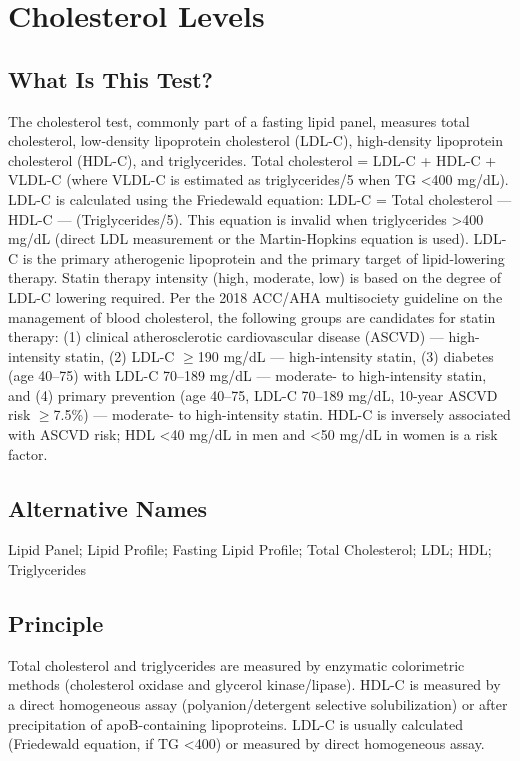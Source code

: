 \chapter{Cholesterol Levels}
\section*{What Is This Test?}
The cholesterol test, commonly part of a fasting lipid panel, measures total cholesterol, low-density lipoprotein cholesterol (LDL-C), high-density lipoprotein cholesterol (HDL-C), and triglycerides. Total cholesterol = LDL-C + HDL-C + VLDL-C (where VLDL-C is estimated as triglycerides/5 when TG <400 mg/dL). LDL-C is calculated using the Friedewald equation: LDL-C = Total cholesterol --- HDL-C --- (Triglycerides/5). This equation is invalid when triglycerides >400 mg/dL (direct LDL measurement or the Martin-Hopkins equation is used). LDL-C is the primary atherogenic lipoprotein and the primary target of lipid-lowering therapy. Statin therapy intensity (high, moderate, low) is based on the degree of LDL-C lowering required. Per the 2018 ACC/AHA multisociety guideline on the management of blood cholesterol, the following groups are candidates for statin therapy: (1) clinical atherosclerotic cardiovascular disease (ASCVD) --- high-intensity statin, (2) LDL-C $\geq$190 mg/dL --- high-intensity statin, (3) diabetes (age 40--75) with LDL-C 70--189 mg/dL --- moderate- to high-intensity statin, and (4) primary prevention (age 40--75, LDL-C 70--189 mg/dL, 10-year ASCVD risk $\geq$7.5\%) --- moderate- to high-intensity statin. HDL-C is inversely associated with ASCVD risk; HDL <40 mg/dL in men and <50 mg/dL in women is a risk factor.
\section*{Alternative Names}
Lipid Panel; Lipid Profile; Fasting Lipid Profile; Total Cholesterol; LDL; HDL; Triglycerides
\section*{Principle}
Total cholesterol and triglycerides are measured by enzymatic colorimetric methods (cholesterol oxidase and glycerol kinase/lipase). HDL-C is measured by a direct homogeneous assay (polyanion/detergent selective solubilization) or after precipitation of apoB-containing lipoproteins. LDL-C is usually calculated (Friedewald equation, if TG <400) or measured by direct homogeneous assay.
